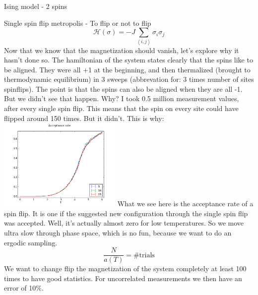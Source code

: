 \documentclass[]{beamer}
\begin{document}
\begin{frame}{Ising model - 2 spins}
\end{frame}

\begin{frame}{Single spin flip metropolis - To flip or not to flip}
\pause
\[ \mathscr{H}(\sigma) = -J \sum\limits_{\left< i, j \right>} \sigma_i \sigma_j \]
 {Now that we know that the magnetization should vanish, let's explore why it hasn't done so.}
 {The hamiltonian of the system states clearly that the spins like to be aligned. They were all +1 at the beginning, and then thermalized (brought to thermodynamic equilibrium) in 3 sweeps (abbrevation for: 3 times number of sites spinflips).}
 {The point is that the spins can also be aligned when they are all -1. But we didn't see that happen. Why?}
 {I took 0.5 million measurement values, after every single spin flip. This means that the spin on every site could have flipped around 150 times. But it didn't. This is why:}
\pause
\centering
\includegraphics[height=12em]{img/single_acceptanceRate.png}
	 {What we see here is the acceptance rate of a spin flip. It is one if the suggested new configuration through the single spin flip was accepted. Well, it's actually almost zero for low temperatures. So we move ultra slow through phase space, which is no fun, because we want to do an ergodic sampling.}
 {\[ \frac{N}{a(T)} = \text{\# trials} \]}
 {We want to change flip the magnetization of the system completely at least 100 times to have good statistics. For uncorrelated measurements we then have an error of 10\%.}
\end{frame}
\end{document}
